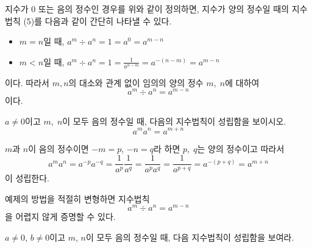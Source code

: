 \documentclass[11pt, a4paper]{book}
\begin{document}
지수가 $0$ 또는 음의 정수인 경우를 위와 같이 정의하면, 지수가 양의 정수일 때의 지수법칙 (5)를 다음과 같이 간단히 나타낼 수 있다. 
\begin{itemize}
	\item $m=n$일 때, $a^m \div a^n = 1=a^{0} = a^{m-n}$
	\item $m<n$일 때, $a^m \div a^n = 1=\frac{1}{a^{n-m}} = a^{-(n-m)} = a^{m-n}$
\end{itemize}
이다. 따라서 $m, n$의 대소와 관계 없이 임의의 양의 정수 $m,\;n$에 대하여 
\[
a^m \div a^n = a^{m-n}
\]
이다.

\begin{example}
	$a\neq 0$이고 $m,\;n$이 모두 음의 정수일 때, 다음의 지수법칙이 성립함을 보이시오.
	\[
	a^m a^n = a^{m+n}
	\]
	\begin{solution}
	 $m$과 $n$이 음의 정수이면 $-m=p$, $-n =q$라 하면 $p,\;q$는 양의 정수이고 따라서
	\[
	a^m a^n = a^{-p} a^{-q} =\frac{1}{a^p}\frac{1}{a^q} = \frac{1}{a^p a^q} =\frac{1}{a^{p+q}}=a^{-(p+q)} = a^{m+n}
	\]
	이 성립한다.
\end{solution}
\end{example}


예제의 방법을 적절히 변형하면 지수법칙 
\begin{equation*}
	a^m \div a^n = a^{m-n}
\end{equation*}
을 어렵지 않게 증명할 수 있다.
\begin{problem}
	$a\ne0$, $b\ne0$이고 $m$, $n$이 모두 음의 정수일 때, 다음 지수법칙이 성립함을 보여라.
\end{problem}
\end{document}

